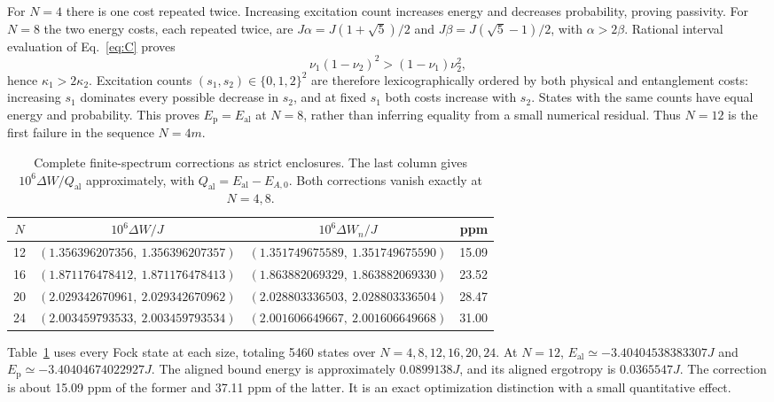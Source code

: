 \documentclass[aps,prb,reprint,amsmath,amssymb,longbibliography,floatfix]{revtex4-2}
\newcommand{\al}{\mathrm{al}}
\newcommand{\pa}{\mathrm{p}}
\begin{document}
For $N=4$ there is one cost repeated twice. Increasing excitation count
increases energy and decreases probability, proving passivity. For $N=8$
the two energy costs, each repeated twice, are
$J\alpha=J(1+\sqrt5)/2$ and $J\beta=J(\sqrt5-1)/2$, with
$\alpha>2\beta$. Rational interval evaluation of Eq.~\eqref{eq:C} proves
\begin{equation}
 \nu_1(1-\nu_2)^2>(1-\nu_1)\nu_2^2,
\end{equation}
hence $\kappa_1>2\kappa_2$. Excitation counts
$(s_1,s_2)\in\{0,1,2\}^2$ are therefore lexicographically ordered by
both physical and entanglement costs: increasing $s_1$ dominates every
possible decrease in $s_2$, and at fixed $s_1$ both costs increase with
$s_2$. States with the same counts have equal energy and probability.
This proves $E_{\pa}=E_{\al}$ at $N=8$, rather than inferring equality
from a small numerical residual. Thus $N=12$ is the first failure in
the sequence $N=4m$.

\begin{table}[t]
\caption{Complete finite-spectrum corrections as strict enclosures. The
last column gives $10^6\Delta W/Q_{\al}$ approximately, with
$Q_{\al}=E_{\al}-E_{A,0}$. Both corrections vanish exactly at $N=4,8$.}
\label{tab:work}
\begin{ruledtabular}
\begin{tabular}{c c c r}
$N$ & $10^6\Delta W/J$ & $10^6\Delta W_n/J$ & ppm\\
\hline
12 & $(1.356396207356,\ 1.356396207357)$ & $(1.351749675589,\ 1.351749675590)$ & 15.09\\
16 & $(1.871176478412,\ 1.871176478413)$ & $(1.863882069329,\ 1.863882069330)$ & 23.52\\
20 & $(2.029342670961,\ 2.029342670962)$ & $(2.028803336503,\ 2.028803336504)$ & 28.47\\
24 & $(2.003459793533,\ 2.003459793534)$ & $(2.001606649667,\ 2.001606649668)$ & 31.00\\
\end{tabular}
\end{ruledtabular}
\end{table}

Table~\ref{tab:work} uses every Fock state at each size, totaling 5460
states over $N=4,8,12,16,20,24$. At $N=12$,
$E_{\al}\simeq-3.40404538383307J$ and
$E_{\pa}\simeq-3.40404674022927J$.
The aligned bound energy is approximately $0.0899138J$, and its aligned
ergotropy is $0.0365547J$. The correction is about 15.09 ppm of the
former and 37.11 ppm of the latter. It is an exact optimization distinction
with a small quantitative effect.
\end{document}
